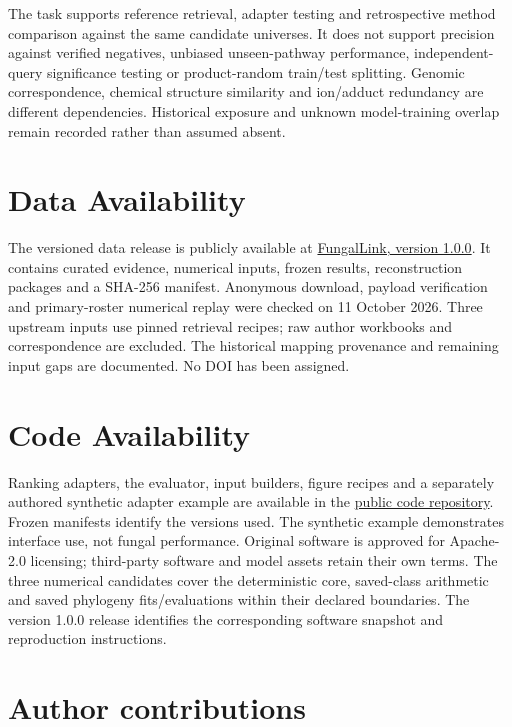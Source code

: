 \documentclass[
  10pt,
  a4paper,
]{article}
\begin{document}
The task supports reference retrieval, adapter testing and retrospective method comparison against the same candidate universes. It does not support precision against verified negatives, unbiased unseen-pathway performance, independent-query significance testing or product-random train/test splitting. Genomic correspondence, chemical structure similarity and ion/adduct redundancy are different dependencies. Historical exposure and unknown model-training overlap remain recorded rather than assumed absent.

\section{Data Availability}\label{data-availability}

The versioned data release is publicly available at \href{https://github.com/vinvomero/fungallink-benchmark/releases/tag/v1.0.0}{FungalLink, version 1.0.0}. It contains curated evidence, numerical inputs, frozen results, reconstruction packages and a SHA-256 manifest. Anonymous download, payload verification and primary-roster numerical replay were checked on 11 October 2026. Three upstream inputs use pinned retrieval recipes; raw author workbooks and correspondence are excluded. The historical mapping provenance and remaining input gaps are documented. No DOI has been assigned.

\section{Code Availability}\label{code-availability}

Ranking adapters, the evaluator, input builders, figure recipes and a separately authored synthetic adapter example are available in the \href{https://github.com/vinvomero/fungallink-benchmark}{public code repository}. Frozen manifests identify the versions used. The synthetic example demonstrates interface use, not fungal performance. Original software is approved for Apache-2.0 licensing; third-party software and model assets retain their own terms. The three numerical candidates cover the deterministic core, saved-class arithmetic and saved phylogeny fits/evaluations within their declared boundaries. The version 1.0.0 release identifies the corresponding software snapshot and reproduction instructions.

\section{Author contributions}\label{author-contributions}
\end{document}
